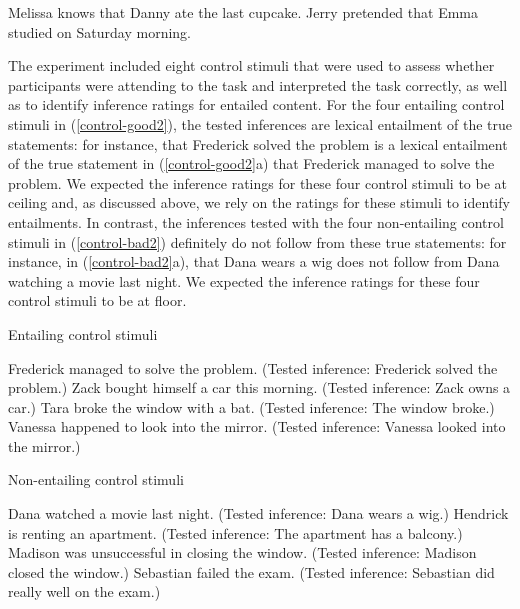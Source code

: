 \documentclass[11pt,fleqn]{article}
\newcommand{\6}{\mbox{$[\hspace*{-.6mm}[$}}
\newcommand{\9}{\mbox{$]\hspace*{-.6mm}]$}}
\begin{document}
\begin{exe}
\ex\label{stims2}
\begin{xlist}
 Melissa knows that Danny ate the last cupcake.
 Jerry pretended that Emma studied on Saturday morning.
\end{xlist}
\end{exe}

The experiment included eight control stimuli that were used to assess whether participants were attending to the task and interpreted the task correctly, as well as to identify inference ratings for entailed content. For the four entailing control stimuli in (\ref{control-good2}), the tested inferences are lexical entailment of the true statements: for instance, that Frederick solved the problem is a lexical entailment of the true statement in (\ref{control-good2}a) that Frederick managed to solve the problem. We expected the inference ratings for these four control stimuli to be at ceiling and, as discussed above, we rely on the ratings for these stimuli to identify entailments. In contrast, the inferences tested with the four non-entailing control stimuli in (\ref{control-bad2}) definitely do not follow from these true statements: for instance, in (\ref{control-bad2}a), that Dana wears a wig does not follow from Dana watching a movie last night. We expected the inference ratings for these four control stimuli to be at floor.

\begin{exe}
\ex\label{control-good2} Entailing control stimuli
\begin{xlist}
 Frederick managed to solve the problem. (Tested inference: Frederick solved the problem.)
 Zack bought himself a car this morning. (Tested inference: Zack owns a car.)
 Tara broke the window with a bat. (Tested inference: The window broke.)
 Vanessa happened to look into the mirror. (Tested inference: Vanessa looked into the mirror.)
\end{xlist}
\ex\label{control-bad2} Non-entailing control stimuli
\begin{xlist}
 Dana watched a movie last night. (Tested inference: Dana wears a wig.)
 Hendrick is renting an apartment. (Tested inference: The apartment has a balcony.)
 Madison was unsuccessful in closing the window. (Tested inference:  Madison closed the window.)
 Sebastian failed the exam. (Tested inference: Sebastian did really well on the exam.)
\end{xlist}
\end{exe}
\end{document}
